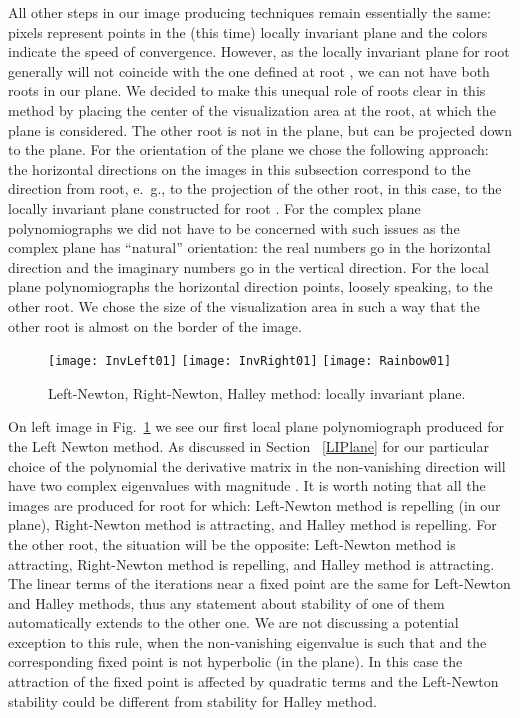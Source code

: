 \documentclass{article}
\theoremstyle{definition}
\begin{document}
All other steps in our image producing techniques remain essentially the same: pixels represent points in the (this time) locally invariant plane and the colors indicate the speed of convergence. However, as the locally invariant plane for root  generally will not coincide with the one defined at root , we can not have both roots in our plane. We decided to make this unequal role of roots clear in this method by placing the center of the visualization area at the root, at which the plane is considered. The other root is not in the plane, but can be projected down to the plane. For the orientation of the plane we chose the following approach: the horizontal directions on the images in this subsection correspond to the direction from root, e.~g.,  to the projection of the other root, in this case,  to the locally invariant plane constructed for root . For the complex plane polynomiographs we did not have to be concerned with such issues as the complex plane has ``natural'' orientation: the real numbers go in the horizontal direction and the imaginary numbers  go in the vertical direction. For the local plane polynomiographs the horizontal direction points, loosely speaking, to the other root. We chose the size of the visualization area in such a way that the other root is almost on the border of the image.

\begin{figure}
\begin{center}
\texttt{[image: InvLeft01]}
\texttt{[image: InvRight01]}
\texttt{[image: Rainbow01]}
\caption{Left-Newton, Right-Newton, Halley method: locally invariant plane.}
\label{LeftLocal}
\end{center}
\end{figure}

On left image in Fig.~\ref{LeftLocal} we see our first local plane polynomiograph produced for the Left Newton method. As discussed in Section ~\ref{LIPlane} for our particular choice of the polynomial the derivative matrix in the non-vanishing direction will have two complex eigenvalues with magnitude . It is worth noting that all the images are produced for root  for which: Left-Newton method is repelling (in our plane), Right-Newton method is attracting, and Halley method is repelling. For the other root, the situation will be the opposite: Left-Newton method is attracting, Right-Newton method is repelling, and Halley method is attracting. The linear terms of the iterations near a fixed point are the same for Left-Newton and Halley methods, thus any statement about stability of one of them automatically extends to the other one. We are not discussing a potential exception to this rule, when the non-vanishing eigenvalue  is such that  and the corresponding fixed point is not hyperbolic (in the plane). In this case the attraction of the fixed point is affected by quadratic terms and the Left-Newton stability could be different from stability for Halley method.
\end{document}
